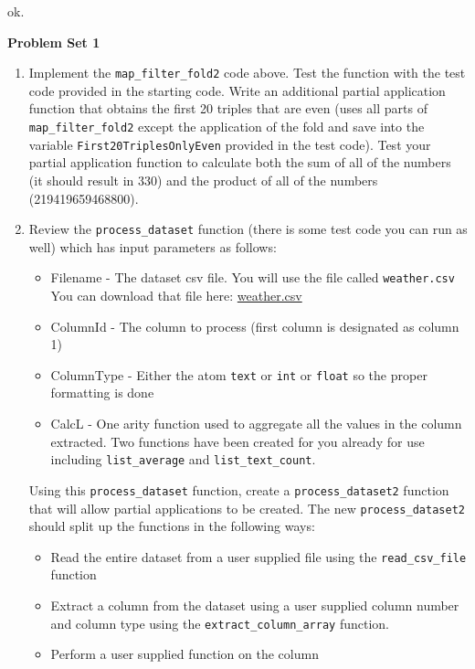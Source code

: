 \documentclass[
]{book}
\newenvironment{Shaded}{\begin{snugshade}}{\end{snugshade}}
\newcommand{\CharTok}[1]{\textcolor[rgb]{0.31,0.60,0.02}{#1}}
\newcommand{\FunctionTok}[1]{\textcolor[rgb]{0.00,0.00,0.00}{#1}}
\providecommand{\tightlist}{%
  \setlength{\itemsep}{0pt}\setlength{\parskip}{0pt}}
\begin{document}
\begin{Shaded}
\begin{Highlighting}[]
    \CharTok{ok}\FunctionTok{.}
\end{Highlighting}
\end{Shaded}

\begin{problembox}

\textbf{Problem Set 1}

\begin{enumerate}
\def\labelenumi{\arabic{enumi}.}
\item
  Implement the \texttt{map\_filter\_fold2} code above. Test the function with the test code provided in the starting code. Write an additional partial application function that obtains the first 20 triples that are even (uses all parts of \texttt{map\_filter\_fold2} except the application of the fold and save into the variable \texttt{First20TriplesOnlyEven} provided in the test code). Test your partial application function to calculate both the sum of all of the numbers (it should result in 330) and the product of all of the numbers (219419659468800).
\item
  Review the \texttt{process\_dataset} function (there is some test code you can run as well) which has input parameters as follows:

  \begin{itemize}
  \tightlist
  \item
    Filename - The dataset csv file. You will use the file called \texttt{weather.csv} You can download that file here: \href{proves/weather.csv}{weather.csv}
  \item
    ColumnId - The column to process (first column is designated as column 1)
  \item
    ColumnType - Either the atom \texttt{text} or \texttt{int} or \texttt{float} so the proper formatting is done
  \item
    CalcL - One arity function used to aggregate all the values in the column extracted. Two functions have been created for you already for use including \texttt{list\_average} and \texttt{list\_text\_count}.
  \end{itemize}

  Using this \texttt{process\_dataset} function, create a \texttt{process\_dataset2} function that will allow partial applications to be created. The new \texttt{process\_dataset2} should split up the functions in the following ways:

  \begin{itemize}
  \tightlist
  \item
    Read the entire dataset from a user supplied file using the \texttt{read\_csv\_file} function
  \item
    Extract a column from the dataset using a user supplied column number and column type using the \texttt{extract\_column\_array} function.\\
  \item
    Perform a user supplied function on the column
  \end{itemize}


\end{enumerate}
\end{problembox}
\end{document}
